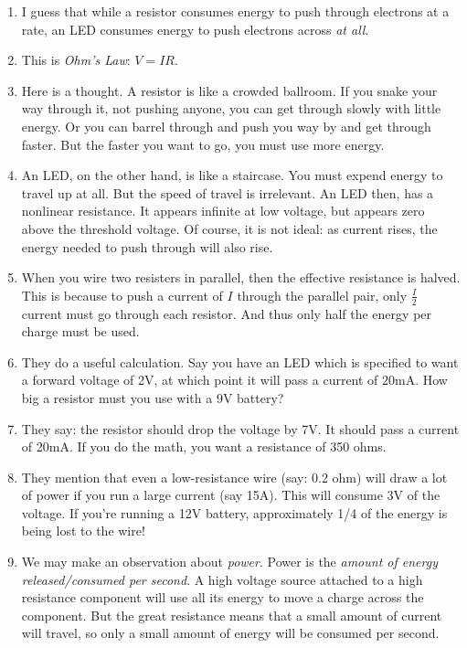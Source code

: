 \documentclass[11pt, oneside]{amsart}
\begin{document}
\begin{enumerate}
  \item I guess that while a resistor consumes energy to push through
  electrons at a rate, an LED consumes energy to push electrons across
  \emph{at all}.

  \item This is \emph{Ohm's Law}: $V = IR$.

  \item Here is a thought. A resistor is like a crowded ballroom. If you
  snake your way through it, not pushing anyone, you can get through
  slowly with little energy. Or you can barrel through and push you way
  by and get through faster. But the faster you want to go, you must use
  more energy.

  \item An LED, on the other hand, is like a staircase. You must expend
  energy to travel up at all. But the speed of travel is irrelevant. An
  LED then, has a nonlinear resistance. It appears infinite at low
  voltage, but appears zero above the threshold voltage. Of course, it
  is not ideal: as current rises, the energy needed to push through will
  also rise.

  \item When you wire two resisters in parallel, then the effective
  resistance is halved. This is because to push a current of $I$ through
  the parallel pair, only $\frac{I}{2}$ current must go through each
  resistor. And thus only half the energy per charge must be used.

  \item They do a useful calculation. Say you have an LED which is
  specified to want a forward voltage of 2V, at which point it will pass
  a current of 20mA. How big a resistor must you use with a 9V battery?

  \item They say: the resistor should drop the voltage by 7V. It should
  pass a current of 20mA. If you do the math, you want a resistance of
  350 ohms.

  \item They mention that even a low-resistance wire (say: 0.2 ohm) will
  draw a lot of power if you run a large current (say 15A). This will
  consume 3V of the voltage. If you're running a 12V battery,
  approximately 1/4 of the energy is being lost to the wire!

  \item We may make an observation about \emph{power}. Power is the
  \emph{amount of energy released/consumed per second}. A high voltage
  source attached to a high resistance component will use all its energy
  to move a charge across the component. But the great resistance means
  that a small amount of current will travel, so only a small amount of
  energy will be consumed per second.


\end{enumerate}
\end{document}
